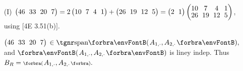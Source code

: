 (I) {\small$\begin{pmatrix} 46 &\hspace{-4pt} 33 &\hspace{-4pt} 20 &\hspace{-4pt} 7 \end{pmatrix}=2\begin{pmatrix} 10 &\hspace{-4pt} 7 &\hspace{-4pt} 4 &\hspace{-4pt} 1\end{pmatrix}+\begin{pmatrix} 26 &\hspace{-4pt} 19 &\hspace{-4pt} 12 &\hspace{-4pt} 5\end{pmatrix}=\begin{pmatrix}2 &\hspace{-4pt} 1\end{pmatrix}\begin{pmatrix} 10 &\hspace{-4pt} 7 &\hspace{-4pt} 4 &\hspace{-4pt} 1\\[-2pt] 26 &\hspace{-4pt} 19 &\hspace{-4pt} 12 &\hspace{-4pt} 5\end{pmatrix}$}, using [4E 3.51(b)].\vspace{3pt}\par\quad\HI
{\footnotesize$\begin{pmatrix} 46 &\hspace{-4pt} 33 &\hspace{-4pt} 20 &\hspace{-4pt} 7 \end{pmatrix}$}${}\in\Span{A_{1,\cdot},A_{2,\cdot}},$ and $\Par{A_{1,\cdot},A_{2,\cdot}}$ is liney indep. Thus $B_R=\BigPar{A_{1,\cdot},A_{2,\cdot}}.$\par\vspace{6pt}\quad\EndI
